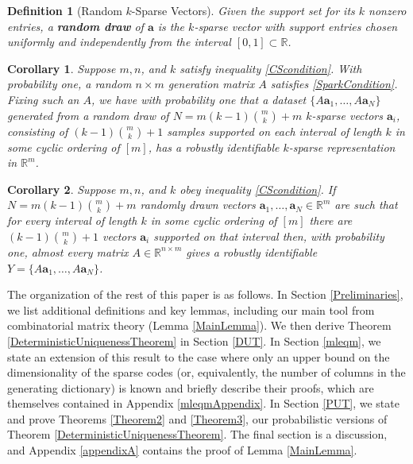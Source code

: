 \documentclass[journal, twocolumn]{IEEEtran}
\newtheorem{definition}{Definition}
\newtheorem{corollary}{Corollary}
\begin{document}
\begin{definition}[Random $k$-Sparse Vectors]\label{RandomDraw}
Given the support set for its $k$ nonzero entries, a \textbf{random draw} of $\mathbf{a}$ is the $k$-sparse vector with support entries chosen uniformly and independently from the interval $[0, 1] \subset \mathbb{R}$. 
\end{definition}

\begin{corollary}
Suppose $m, n$, and $k$ satisfy inequality \eqref{CScondition}. With probability one, a random $n \times m$ generation matrix $A$ satisfies \eqref{SparkCondition}. Fixing such an $A$, we have with probability one that a dataset $\{A\mathbf{a}_1, \ldots , A\mathbf{a}_N\}$ generated from a random draw of $N = m(k-1){m \choose k}+m$ $k$-sparse vectors $\mathbf{a}_i$, consisting of $(k-1){m \choose k}+1$ samples supported on each interval of length $k$ in some cyclic ordering of $[m]$, has a robustly identifiable $k$-sparse representation in $\mathbb{R}^m$.
\end{corollary}

\begin{corollary}
Suppose $m, n$, and $k$ obey inequality \eqref{CScondition}.  If $N = m(k-1){m \choose k}+m$ randomly drawn vectors $\mathbf{a}_1, \ldots, \mathbf{a}_N \in \mathbb{R}^m$ are such that for every interval of length $k$ in some cyclic ordering of $[m]$ there are $(k-1){m \choose k}+1$ vectors $\mathbf{a}_i$ supported on that interval then, with probability one, almost every matrix $A \in \mathbb{R}^{n \times m}$ gives a robustly identifiable $Y = \{A\mathbf{a}_1, \ldots , A\mathbf{a}_N \}$.
\end{corollary}

The organization of the rest of this paper is as follows. In Section \ref{Preliminaries}, we list additional definitions and key lemmas, including our main tool from combinatorial matrix theory (Lemma \ref{MainLemma}). We then derive Theorem \ref{DeterministicUniquenessTheorem} in Section \ref{DUT}. In Section \ref{mleqm}, we state an extension of this result to the case where only an upper bound on the dimensionality of the sparse codes (or, equivalently, the number of columns in the generating dictionary) is known and briefly describe their proofs, which are themselves contained in Appendix \ref{mleqmAppendix}. In Section \ref{PUT}, we state and prove Theorems \ref{Theorem2} and \ref{Theorem3}, our probabilistic versions of Theorem \ref{DeterministicUniquenessTheorem}. The final section is a discussion, and Appendix \ref{appendixA} contains the proof of Lemma \ref{MainLemma}.
\end{document}
